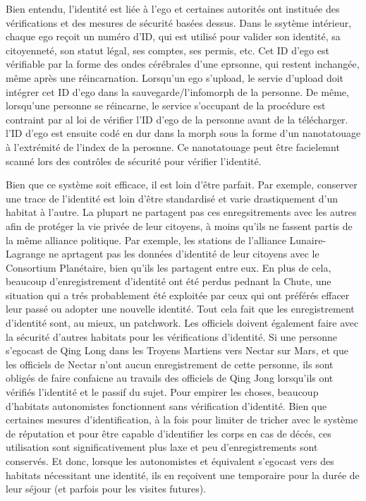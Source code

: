 Bien entendu, l'identité est liée à l'ego et certaines autorités ont instituée des vérifications et des mesures de sécurité basées dessus. Dans le ssytème intérieur, chaque ego reçoit un numéro d'ID, qui est utilisé pour valider son identité, sa citoyenneté, son statut légal, ses comptes, ses permis, etc. Cet ID d'ego est vérifiable par la forme des ondes cérébrales d'une eprsonne, qui restent inchangée, même après une réincarnation. Lorsqu'un ego s'upload, le servie d'upload doit intégrer cet ID d'ego dans la sauvegarde/l'infomorph de la personne. De même, lorsqu'une personne se réincarne, le service s'occupant de la procédure est contraint par al loi de vérifier l'ID d'ego de la personne avant de la télécharger. l'ID d'ego est ensuite codé en dur dans la morph sous la forme d'un nanotatouage à l'extrémité de l'index de la perosnne. Ce nanotatouage peut être facielemnt scanné lors des contrôles de sécurité pour vérifier l'identité. 

Bien que ce système soit efficace, il est loin d'être parfait. Par exemple, conserver une trace de l'identité est loin d'être standardisé et varie drastiquement d'un habitat à l'autre. La plupart ne partagent pas ces enregsitrements avec les autres afin de protéger la vie privée de leur citoyens, à moins qu'ils ne fassent partis de la même alliance politique. Par exemple, les stations de l'alliance Lunaire-Lagrange ne aprtagent pas les données d'identité de leur citoyens avec le Consortium Planétaire, bien qu'ils les partagent entre eux. En plus de cela, beaucoup d'enregistrement d'identité ont été perdus pednant la Chute, une situation qui a trés probablement été exploitée par ceux qui ont préférés effacer leur passé ou adopter une nouvelle identité. Tout cela fait que les enregistrement d'identité sont, au mieux, un patchwork. Les officiels doivent également faire avec la sécurité d'autres habitats pour les vérifications d'identité. Si une personne s'egocast de Qing Long dans les Troyens Martiens vers Nectar sur Mars, et que les officiels de Nectar n'ont aucun enregistrement de cette personne, ils sont obligés de faire confaicne au travails des officiels de Qing Jong lorsqu'ils ont vérifiés l'identité et le passif du sujet. Pour empirer les choses, beaucoup d'habitats autonomistes fonctionnent sans vérification d'identité. Bien que certaines mesures d'identification, à la fois pour limiter de tricher avec le système de réputation et pour être capable d'identifier les corps en cas de décés, ces utilisation sont significativement plus laxe et peu d'enregistrements sont conservés. Et donc, lorsque les autonomistes et équivalent s'egocast vers des habitats nécessitant une identité, ils en reçoivent une temporaire pour la durée de leur séjour (et parfois pour les visites futures). 

